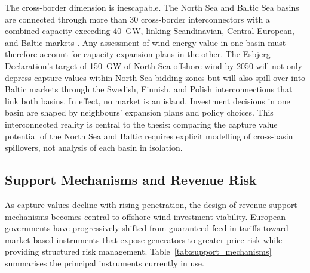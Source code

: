 The cross-border dimension is inescapable. The North Sea and Baltic Sea basins are connected through more than 30 cross-border interconnectors with a combined capacity exceeding 40~GW, linking Scandinavian, Central European, and Baltic markets \cite{ACER2025}. Any assessment of wind energy value in one basin must therefore account for capacity expansion plans in the other. The Esbjerg Declaration's target of 150~GW of North Sea offshore wind by 2050 will not only depress capture values within North Sea bidding zones but will also spill over into Baltic markets through the Swedish, Finnish, and Polish interconnections that link both basins. In effect, no market is an island. Investment decisions in one basin are shaped by neighbours' expansion plans and policy choices. This interconnected reality is central to the thesis: comparing the capture value potential of the North Sea and Baltic requires explicit modelling of cross-basin spillovers, not analysis of each basin in isolation.

\subsection{Support Mechanisms and Revenue Risk}\label{sec:support_mechanisms}

As capture values decline with rising penetration, the design of revenue support mechanisms becomes central to offshore wind investment viability. European governments have progressively shifted from guaranteed feed-in tariffs toward market-based instruments that expose generators to greater price risk while providing structured risk management. Table~\ref{tab:support_mechanisms} summarises the principal instruments currently in use.

